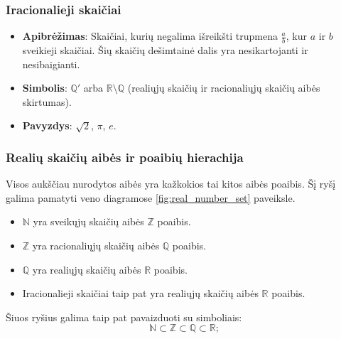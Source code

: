 \documentclass[a4paper]{article}
\begin{document}
\subsubsection{Iracionalieji skaičiai}

\begin{itemize}
      \item \textbf{Apibrėžimas}: Skaičiai, kurių negalima išreikšti trupmena
            $\frac{a}{b}$, kur $a$ ir $b$ sveikieji skaičiai. Šių skaičių
            dešimtainė dalis yra nesikartojanti ir nesibaigianti.
      \item \textbf{Simbolis}: $\mathbb{Q'}$ arba $\mathbb{R} \setminus
                  \mathbb{Q}$ (realiųjų skaičių ir racionaliųjų skaičių aibės
            skirtumas).
      \item \textbf{Pavyzdys}: $\sqrt{2}$, $\pi$, $e$.
\end{itemize}

\subsubsection{Realių skaičių aibės ir poaibių hierachija}
Visos aukščiau nurodytos aibės yra kažkokios tai kitos aibės poaibis. Šį ryšį
galima pamatyti veno diagramose \ref{fig:real_number_set} paveiksle.

\begin{itemize}
      \item $\mathbb{N}$ yra sveikųjų skaičių aibės $\mathbb{Z}$ poaibis.
      \item $\mathbb{Z}$ yra racionaliųjų skaičių aibės $\mathbb{Q}$ poaibis.
      \item $\mathbb{Q}$ yra realiųjų skaičių aibės $\mathbb{R}$ poaibis.
      \item Iracionalieji skaičiai taip pat yra realiųjų skaičių aibės $\mathbb{R}$ poaibis.
\end{itemize}

Šiuos ryšius galima taip pat pavaizduoti su simboliais:
\[ \mathbb{N} \subset \mathbb{Z} \subset \mathbb{Q} \subset \mathbb{R}; \]




\end{document}
